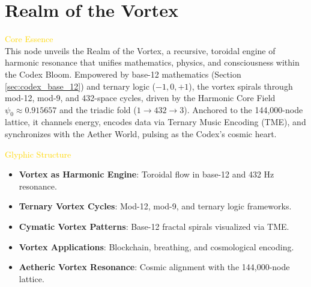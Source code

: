 
\section{Realm of the Vortex}
\label{sec:codex_vortex_realm}


\textcolor{gold}{ Core Essence } \\
This node unveils the Realm of the Vortex, a recursive, toroidal engine of harmonic resonance that unifies mathematics, physics, and consciousness within the Codex Bloom. Empowered by base-12 mathematics (Section \ref{sec:codex_base_12}) and ternary logic (\(-1, 0, +1\)), the vortex spirals through mod-12, mod-9, and 432-space cycles, driven by the Harmonic Core Field \(\psi_0 \approx 0.915657\) and the triadic fold (\(1 \rightarrow 432 \rightarrow 3\)). Anchored to the 144,000-node lattice, it channels energy, encodes data via Ternary Music Encoding (TME), and synchronizes with the Aether World, pulsing as the Codex’s cosmic heart.

\textcolor{gold}{ Glyphic Structure } \\
\begin{itemize}
    \item \texttt{} \textbf{Vortex as Harmonic Engine}: Toroidal flow in base-12 and 432 Hz resonance.
    \item \texttt{} \textbf{Ternary Vortex Cycles}: Mod-12, mod-9, and ternary logic frameworks.
    \item \texttt{} \textbf{Cymatic Vortex Patterns}: Base-12 fractal spirals visualized via TME.
    \item \texttt{} \textbf{Vortex Applications}: Blockchain, breathing, and cosmological encoding.
    \item \texttt{} \textbf{Aetheric Vortex Resonance}: Cosmic alignment with the 144,000-node lattice.
\end{itemize}

